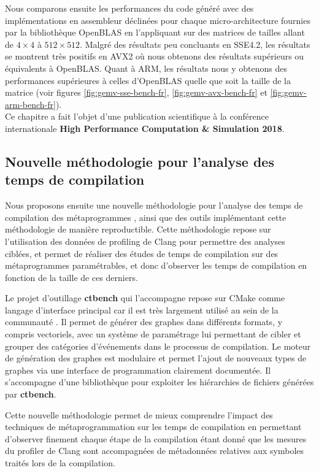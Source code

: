 \documentclass[main]{subfiles}
\begin{document}
Nous comparons ensuite les performances du code g\'en\'er\'e avec des
impl\'ementations en assembleur d\'eclin\'ees pour chaque micro-architecture
fournies par la biblioth\`eque OpenBLAS en l'appliquant sur des matrices de
tailles allant de $4 \times 4$ \`a $512 \times 512$.
Malgr\'e des r\'esultats peu concluants en SSE4.2, les r\'esultats se montrent
tr\`es positifs en AVX2 o\`u nous obtenons des r\'esultats sup\'erieurs ou
\'equivalents \`a OpenBLAS. Quant \`a ARM, les r\'esultats nous y obtenons
des performances sup\'erieures \`a celles d'OpenBLAS quelle que soit la taille
de la matrice (voir figures \ref{fig:gemv-sse-bench-fr},
\ref{fig:gemv-avx-bench-fr} et \ref{fig:gemv-arm-bench-fr}).
\\

Ce chapitre a fait l'objet d'une publication scientifique \`a la conf\'erence
internationale \textbf{High Performance Computation \& Simulation 2018}.

\subsection*{
  Nouvelle m\'ethodologie pour l'analyse des temps de compilation
}

Nous proposons ensuite une nouvelle m\'ethodologie pour l'analyse des temps
de compilation des m\'etaprogrammes \cpp, ainsi que des outils impl\'ementant
cette m\'ethodologie de mani\`ere reproductible. Cette m\'ethodologie
repose sur l'utilisation des donn\'ees de profiling de Clang pour permettre
des analyses cibl\'ees, et permet de r\'ealiser des \'etudes de temps
de compilation sur des m\'etaprogrammes param\'etrables, et donc d'observer
les temps de compilation en fonction de la taille de ces derniers.

Le projet d'outillage \textbf{ctbench} qui l'accompagne repose sur CMake
comme langage d'interface principal car il est tr\`es largement utilis\'e
au sein de la communaut\'e \cpp. Il permet de g\'en\'erer des graphes dans
diff\'erents formats, y compris vectoriels, avec un syst\`eme de param\'etrage
lui permettant de cibler et grouper des cat\'egories d'\'ev\'enements
dans le processus de compilation.
Le moteur de g\'en\'eration des graphes est modulaire
et permet l'ajout de nouveaux types de graphes via une interface
de programmation clairement document\'ee. Il s'accompagne d'une biblioth\`eque
\cpp pour exploiter les hi\'erarchies de fichiers g\'en\'er\'ees
par \textbf{ctbench}.

Cette nouvelle m\'ethodologie permet de mieux comprendre l'impact des
techniques de m\'etaprogrammation sur les temps de compilation en permettant
d'observer finement chaque \'etape de la compilation \'etant donn\'e que les
mesures du profiler de Clang sont accompagn\'ees de m\'etadonn\'ees relatives
aux symboles \cpp trait\'es lors de la compilation.
\\
\end{document}
